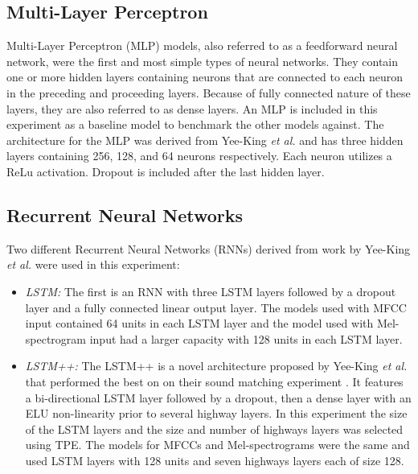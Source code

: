 
\subsection{Multi-Layer Perceptron}
Multi-Layer Perceptron (MLP) models, also referred to as a feedforward neural network, were the first and most simple types of neural networks. They contain one or more hidden layers containing neurons that are connected to each neuron in the preceding and proceeding layers. Because of fully connected nature of these layers, they are also referred to as dense layers. An MLP is included in this experiment as a baseline model to benchmark the other models against. The architecture for the MLP was derived from Yee-King \textit{et al.} \cite{yee2018automatic} and has three hidden layers containing 256, 128, and 64 neurons respectively. Each neuron utilizes a ReLu activation. Dropout is included after the last hidden layer.

\subsection{Recurrent Neural Networks}
Two different Recurrent Neural Networks (RNNs) derived from work by Yee-King \textit{et al.} \cite{yee2018automatic} were used in this experiment:
\begin{itemize}
    \item \textit{LSTM:} The first is an RNN with three LSTM layers followed by a dropout layer and a fully connected linear output layer. The models used with MFCC input contained 64 units in each LSTM layer and the model used with Mel-spectrogram input had a larger capacity with 128 units in each LSTM layer.
    \item \textit{LSTM++:} The LSTM++ is a novel architecture proposed by Yee-King \textit{et al.} that performed the best on on their sound matching experiment \cite{yee2018automatic}. It features a bi-directional LSTM layer followed by a dropout, then a dense layer with an ELU non-linearity prior to several highway layers. In this experiment the size of the LSTM layers and the size and number of highways layers was selected using TPE. The models for MFCCs and Mel-spectrograms were the same and used LSTM layers with 128 units and seven highways layers each of size 128.
\end{itemize}

